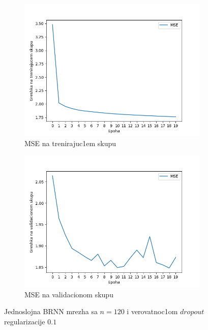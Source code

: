 \documentclass[a4paper, openany, oneside, 11pt]{book}
\begin{document}
\newpage
\begin{figure}[!h]
        \centering
        \begin{subfigure}{0.475\textwidth}
            \centering
            \includegraphics[scale=0.43]{res/SL_BLSTM_120units_d01_train.png}
            \caption{\acrshort{MSE} na trenirajuc1em skupu}
            \label{fig:4_14a}
            \vspace{0pt}
        \end{subfigure}%
        \begin{subfigure}{0.475\textwidth}
            \centering
            \includegraphics[scale=0.43]{res/SL_BLSTM_120units_d01_validation.png}
            \caption{\acrshort{MSE} na validacionom skupu}
            \label{fig:4_14b}
            \vspace{0pt}
        \end{subfigure}
        \caption{Jednoslojna \acrshort{BRNN} mrezha sa $n=120$ i verovatnoc1om $dropout$ regularizacije $0.1$}
        \label{fig:4_14}
\end{figure}
\end{document}
